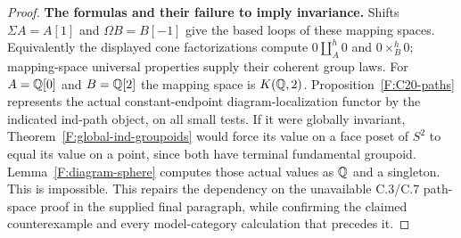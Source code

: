 \begin{proof}
\textbf{The formulas and their failure to imply invariance.} Shifts
$\Sigma A=A[1]$ and $\Omega B=B[-1]$ give the based loops of these
mapping spaces. Equivalently the displayed cone factorizations compute
$0\amalg_A^h0$ and $0\times_B^h0$; mapping-space universal properties
supply their coherent group laws. For $A=\mathbb Q[0]$ and $B=\mathbb Q[2]$ the mapping
space is $K(\mathbb Q,2)$. Proposition~\ref{F:C20-paths} represents the actual
constant-endpoint diagram-localization functor by the indicated
ind-path object, on all small tests. If it were globally invariant,
Theorem~\ref{F:global-ind-groupoids} would force its value on a face
poset of $S^2$ to equal its value on a point, since both have terminal
fundamental groupoid. Lemma~\ref{F:diagram-sphere} computes those
actual values as $\mathbb Q$ and a singleton. This is impossible. This repairs
the dependency on the unavailable C.3/C.7 path-space proof in the
supplied final paragraph, while confirming the claimed counterexample
and every model-category calculation that precedes it.
\end{proof}
